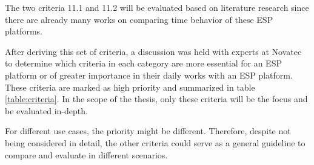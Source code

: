 The two criteria 11.1 and 11.2 will be evaluated based on literature research since there are already many works on comparing time behavior of these ESP platforms.

After deriving this set of criteria, a discussion was held with experts at Novatec to determine which criteria in each category are more essential for an ESP platform or of greater importance in their daily works with an ESP platform. These criteria are marked as high priority and summarized in table \ref{table:criteria}. In the scope of the thesis, only these criteria will be the focus and be evaluated in-depth. 

For different use cases, the priority might be different. Therefore, despite not being considered in detail, the other criteria could serve as a general guideline to compare and evaluate in different scenarios. 

